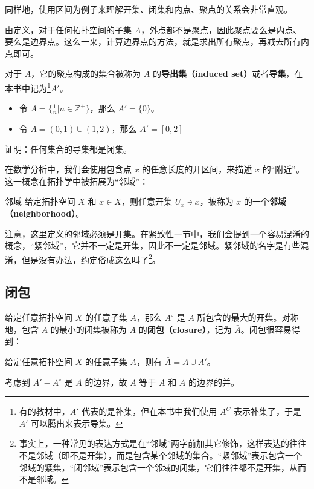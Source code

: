 同样地，使用区间为例子来理解开集、闭集和内点、聚点的关系会非常直观。

由定义，对于任何拓扑空间的子集 $A$，外点都不是聚点，因此聚点要么是内点、要么是边界点。这么一来，计算边界点的方法，就是求出所有聚点，再减去所有内点即可。

对于 $A$，它的聚点构成的集合被称为 $A$ 的\textbf{导出集（induced set）}或者\textbf{导集}，在本书中记为\footnote{有的教材中，$A'$ 代表的是补集，但在本书中我们使用 $A^C$ 表示补集了，于是 $A'$ 可以腾出来表示导集。}$A'$。

\begin{example}{}
\begin{itemize}
\item 令 $A=\{\frac{1}{n}|n\in\mathbb{Z}^+\}$，那么 $A'=\{0\}$。
\item 令 $A=(0,1)\cup(1,2)$，那么 $A'=[0,2]$
\end{itemize}
\end{example}

\begin{exercise}{}
证明：任何集合的导集都是闭集。
\end{exercise}

在数学分析中，我们会使用包含点 $x$ 的任意长度的开区间，来描述 $x$ 的“附近”。这一概念在拓扑学中被拓展为“邻域”：

\begin{definition}{邻域}
给定拓扑空间 $X$ 和 $x\in X$，则任意开集 $U_x\ni x$，被称为 $x$ 的一个\textbf{邻域（neighborhood）}。
\end{definition}

注意，这里定义的邻域必须是开集。在紧致性一节中，我们会提到一个容易混淆的概念，“紧邻域”，它并不一定是开集，因此不一定是邻域。紧邻域的名字是有些混淆，但是没有办法，约定俗成这么叫了\footnote{事实上，一种常见的表达方式是在“邻域”两字前加其它修饰，这样表达的往往不是邻域（即不是开集），而是包含某个邻域的集合。“紧邻域”表示包含一个邻域的紧集，“闭邻域”表示包含一个邻域的闭集，它们往往都不是开集，从而不是邻域。}。



\subsection{闭包}

给定任意拓扑空间 $X$ 的任意子集 $A$，那么 $A^\circ$ 是 $A$ 所包含的最大的开集。对称地，包含 $A$ 的最小的闭集被称为 $A$ 的\textbf{闭包（closure）}，记为 $\bar{A}$。闭包很容易得到：

\begin{theorem}{}
给定任意拓扑空间 $X$ 的任意子集 $A$，则有 $\bar{A}=A\cup A'$。
\end{theorem}
\begin{corollary}{}\label{cor_Topo0_1}
考虑到 $A'-A^\circ$ 是 $A$ 的边界，故 $\bar{A}$ 等于 $A$ 和 $A$ 的边界的并。
\end{corollary}

